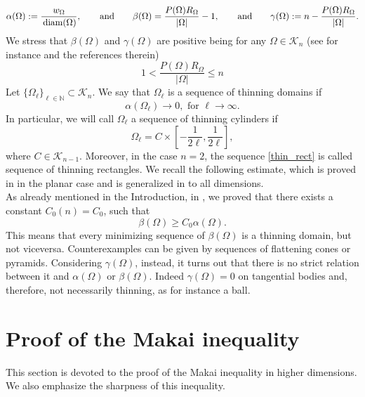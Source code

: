 \documentclass[oneside,a4paper,11pt,notitlepage]{article}
\newcommand{\abs}[1]{{\left|#1\right|}}
\theoremstyle{definition}
\theoremstyle{plain}
\theoremstyle{definition}
\DeclareMathOperator{\diam}{\, \textup{diam}}
\begin{document}
\begin{equation*}
\alpha(\Omega):=\frac{w_\Omega}{\diam(\Omega)}, \qquad \text{and}  \qquad \beta(\Omega) = \frac{P(\Omega)R_\Omega}{\abs{\Omega}}-1, \qquad \text{and} \qquad   \gamma(\Omega):=n-\frac{P(\Omega)R_\Omega}{\abs{\Omega}}.
\end{equation*}
We stress that $\beta(\Omega)$ and $\gamma(\Omega)$ are positive being for any $\Omega \in \mathcal K_n$ (see for instance \cite{AGS} and the references therein)
\[
1<\frac{P(\Omega)R_\Omega}{\abs{\Omega}}\le n
\]
Let $\{\Omega_\ell\}_{\ell\in \mathbb N}\subset\mathcal{K}_n$. We say that $\Omega_\ell$ is a sequence of thinning domains if
    \begin{equation}
\alpha(\Omega_\ell)\to0, \text{ for } \ell \to \infty.
    \end{equation}
\noindent In particular, we will call $\Omega_\ell$ a sequence of thinning cylinders if 
    \begin{equation}\label{thin_rect}
    \Omega_\ell = C \times \left[-\frac{1}{2\ell}, \frac{1}{2\ell}\right],
\end{equation}
    where $C\in \mathcal{K}_{n-1}$. Moreover, in the case $n=2$, the sequence \eqref{thin_rect} is called sequence of thinning rectangles.
We recall the following estimate, which is proved in \cite{fenchel_bonnesen} in the planar case and is generalized in \cite{DBN,Kova} to all dimensions.\\
As already mentioned in the Introduction, in \cite{AGS}, we proved that there exists a constant $C_0(n)=C_0$, such that
\begin{equation*}
    \beta(\Omega)\ge C_0\alpha(\Omega).
\end{equation*}
This means that every minimizing sequence of $\beta(\Omega)$ is a thinning domain, but not viceversa. Counterexamples can be given by sequences of flattening cones or pyramids. Considering $\gamma(\Omega)$, instead, it turns out that there is no strict relation between it and $\alpha(\Omega)$ or $\beta(\Omega)$. Indeed $\gamma(\Omega)= 0$ on tangential bodies and, therefore, not necessarily thinning, as for instance a ball.

\section{Proof of the Makai inequality}
\label{sec3}

This section is devoted to the proof of the Makai inequality in higher dimensions. We also emphasize the sharpness of this inequality.
\end{document}
